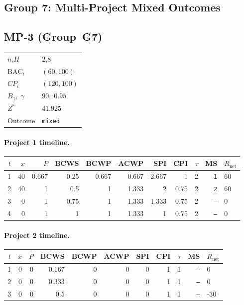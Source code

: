 \documentclass[12pt, a4paper]{article}
\newcommand{\BAC}{\mathrm{BAC}}
\begin{document}
\newpage


\subsection*{Group 7: Multi-Project Mixed Outcomes}

\subsection*{MP-3  (Group~G7)}
\begin{center}
\begin{tabular}{ll}
\toprule
$n$,\;$H$ & $2$,\;$8$ \\
$\BAC_i$ & $(60, 100)$ \\
$CP_i$   & $(120, 100)$ \\
$B_1,\;\gamma$ & $90,\;0.95$ \\
$Z^*$ & $41.925$ \\
Outcome & \texttt{mixed} \\
\bottomrule
\end{tabular}
\end{center}

\paragraph{Project 1 timeline.}
\begin{center}
\begin{tabular}{rrrrrrrrrrl}
\toprule
$t$ & $x$ & $P$ & BCWS & BCWP & ACWP & SPI & CPI & $\tau$ & MS & $R_{\mathrm{net}}$\\
\midrule
1 & 40 & 0.667 & 0.25 & 0.667 & 0.667 & 2.667 & 1 & 2 & \texttt{1} & 60 \\
2 & 40 & 1 & 0.5 & 1 & 1.333 & 2 & 0.75 & 2 & \texttt{2} & 60 \\
3 & 0 & 1 & 0.75 & 1 & 1.333 & 1.333 & 0.75 & 2 & \texttt{---} & 0 \\
4 & 0 & 1 & 1 & 1 & 1.333 & 1 & 0.75 & 2 & \texttt{---} & 0 \\
\bottomrule
\end{tabular}
\end{center}
\paragraph{Project 2 timeline.}
\begin{center}
\begin{tabular}{rrrrrrrrrrl}
\toprule
$t$ & $x$ & $P$ & BCWS & BCWP & ACWP & SPI & CPI & $\tau$ & MS & $R_{\mathrm{net}}$\\
\midrule
1 & 0 & 0 & 0.167 & 0 & 0 & 0 & 1 & 1 & \texttt{---} & 0 \\
2 & 0 & 0 & 0.333 & 0 & 0 & 0 & 1 & 1 & \texttt{---} & 0 \\
3 & 0 & 0 & 0.5 & 0 & 0 & 0 & 1 & 1 & \texttt{---} & -30 \\
\bottomrule
\end{tabular}
\end{center}
\end{document}
